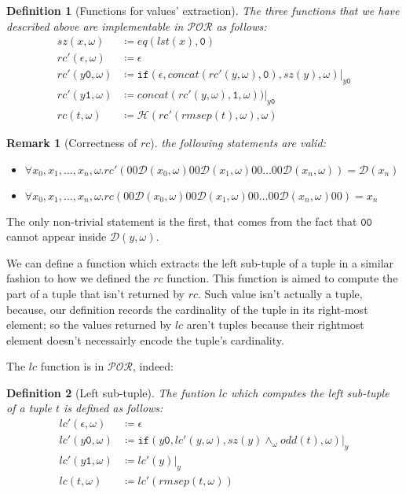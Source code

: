\documentclass[10pt]{amsart}
\newcommand{\POR}{\mathcal{POR}}
\newcommand{\zero}{\mathtt{0}}
\newcommand{\one}{\mathtt{1}}
\newcommand{\vone}{x}
\newcommand{\vtwo}{y}
\newcommand{\oone}{\omega}
\newcommand{\concat}{concat}
\newcommand{\db}{\mathcal D}
\newcommand{\hv}{\mathcal H}
\newcommand{\If}{\mathtt{if}}
\newtheorem{defn}{Definition}
\newtheorem{remark}{Remark}
\begin{document}
\begin{defn}[Functions for values' extraction]
The three functions that we have described above are implementable in $\POR$ as follows:
\begin{align*}
sz(x, \oone)&\coloneqq eq(lst(x), \zero)\\
rc'(\epsilon, \oone)&\coloneqq \epsilon\\
rc'(\vtwo\zero, \oone)&\coloneqq \If(\epsilon, concat (rc'(\vtwo, \oone),\zero), sz(\vtwo), \oone)|_{\vtwo\zero}\\
rc'(\vtwo\one, \oone)&\coloneqq  \concat (rc'(\vtwo, \oone), \one, \oone))|_{\vtwo\zero}\\
rc (t, \oone)&\coloneqq \hv(rc'(rmsep(t), \oone), \oone)
\end{align*}
\end{defn}

\begin{remark}[Correctness of $rc$] the following statements are valid:\\
\begin{itemize}
\item $\forall \vone_0, \vone_1, \ldots,\vone_n, \oone. rc' (00\db(\vone_0, \oone) 00 \db(\vone_1, \oone) 00 \ldots 00 \db(\vone_n, \oone)) = \db(\vone_n)$
\item $\forall \vone_0, \vone_1, \ldots,\vone_n, \oone. rc (00\db(\vone_0, \oone) 00 \db(\vone_1, \oone) 00 \ldots 00 \db(\vone_n, \oone) 00) = \vone_n$
\end{itemize}
\end{remark}

The only non-trivial statement is the first, that comes from the fact that $\zero\zero$ cannot appear inside $\db(\vtwo, \oone)$.

We can define a function which extracts the left sub-tuple of a tuple in a similar fashion to how we defined the $rc$ function. This function is aimed to compute the part of a tuple that isn't returned by $rc$. Such value isn't actually a tuple, because, our definition records the cardinality of the tuple in its right-most element; so the values returned by $lc$ aren't tuples because their rightmost element doesn't necessairly encode the tuple's cardinality.

The $lc$ function is in $\POR$, indeed:

\begin{defn}[Left sub-tuple]

The funtion $lc$ which computes the left sub-tuple of a tuple $t$ is defined as follows:
\begin{align*}
lc'(\epsilon, \oone)&\coloneqq \epsilon\\
lc'(\vtwo\zero, \oone)&\coloneqq \If(\vtwo\zero, lc'(\vtwo, \oone), sz(\vtwo) \land_\oone odd(t), \oone)|_y\\
lc'(\vtwo\one, \oone)&\coloneqq lc'(\vtwo)|_y\\
lc (t, \oone)&\coloneqq lc'(rmsep(t, \oone))
\end{align*}
\end{defn}
\end{document}
